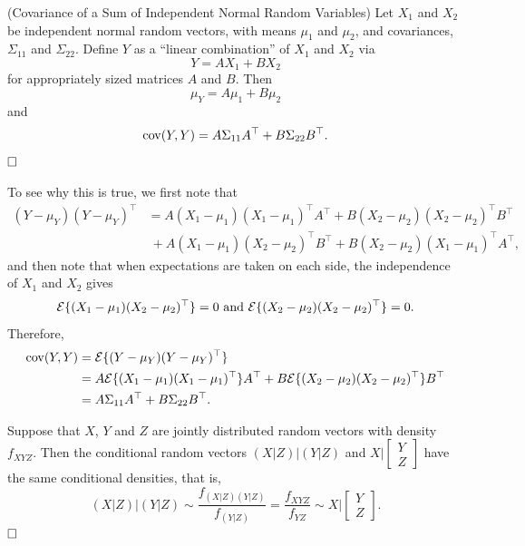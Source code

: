 \begin{keyfact} 
\label{keyfact3}
(Covariance of a Sum of Independent Normal Random Variables) Let $X_1$ and $X_2$ be independent normal random vectors, with means $\mu_1$ and $\mu_2$, and covariances, $\Sigma_{11}$ and $\Sigma_{22}$. Define $Y$ as a ``linear combination'' of $X_1$ and $X_2$ via
 $$Y=A X_1 + BX_2$$
 for appropriately sized matrices $A$ and $B$. Then
 $$\mu_Y = A \mu_1 + B \mu_2$$
 and
 $$\mathrm{cov}(Y,Y) = A\Sigma_{11} A^\top + B \Sigma_{22} B^\top.$$
 $\hfill \square$
\end{keyfact} 

 To see why this is true, we first note that
\begin{align*}(Y-\mu_Y)(Y-\mu_Y)^\top &= A (X_1-\mu_1)(X_1-\mu_1)^\top A^\top +  B (X_2-\mu_2)(X_2-\mu_2)^\top B^\top \\
&~ +  A (X_1-\mu_1)(X_2-\mu_2)^\top B^\top + B (X_2-\mu_2) (X_1-\mu_1)^\top A^\top,
\end{align*}
and then note that when expectations are taken on each side, the independence of $X_1$ and $X_2$ gives
$${\cal E}\{ (X_1-\mu_1)(X_2-\mu_2)^\top \}=0 \text{ and } {\cal E}\{ (X_2-\mu_2)(X_2-\mu_2)^\top \}=0.$$
Therefore,
\begin{align*}
\mathrm{cov}(Y,Y) &= \mathcal{E}\{(Y-\mu_Y)(Y-\mu_Y)^\top  \}\\
&= A  {\cal E }\{ (X_1-\mu_1)(X_1-\mu_1)^\top \} A^\top +  B {\cal E}\{  (X_2-\mu_2)(X_2-\mu_2)^\top \} B^\top \\
&= A\Sigma_{11} A^\top + B \Sigma_{22} B^\top.
\end{align*}

\begin{keyfact} 
\label{keyfact4}
Suppose that $X$, $Y$ and $Z$ are jointly distributed random vectors with density $f_{X Y Z}$. Then the conditional random vectors $(X|Z)\big| (Y|Z)$ and $ X\big|\begin{bmatrix} Y \\ Z \end{bmatrix}$ have the same conditional densities, that is, 
$$ (X|Z)\big| (Y|Z) \sim \frac{f_{(X|Z)(Y|Z)}}{f_{(Y|Z)}}=\frac{f_{XYZ}}{f_{YZ}}\sim  X\big|\begin{bmatrix} Y \\ Z \end{bmatrix}.$$ 
$\hfill \square$

\end{keyfact}

